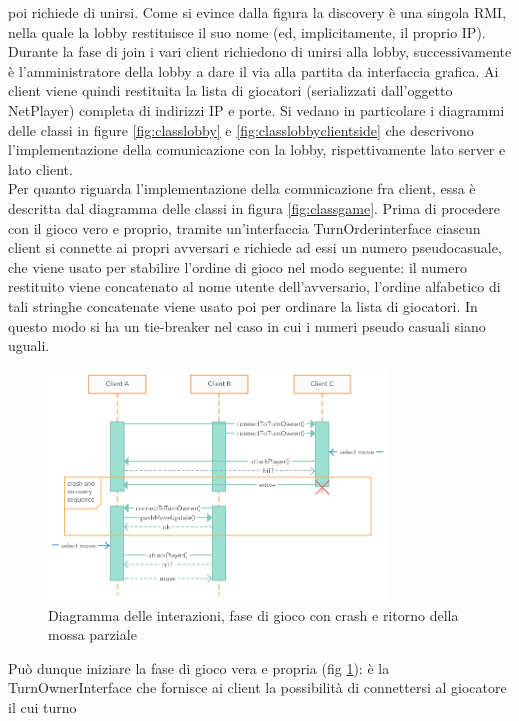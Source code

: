 poi richiede di unirsi. Come si evince dalla figura la discovery è una singola 
RMI, nella quale la lobby restituisce il suo nome (ed, implicitamente, il 
proprio IP). Durante la fase di join i vari client richiedono di unirsi alla 
lobby, successivamente è l'amministratore della lobby a dare il via alla 
partita da interfaccia grafica. Ai client viene quindi restituita la lista di 
giocatori (serializzati dall'oggetto NetPlayer) completa di indirizzi IP e 
porte. Si vedano in particolare i diagrammi delle classi in figure \ref{fig:classlobby}
e \ref{fig:classlobbyclientside} che descrivono l'implementazione della comunicazione con la lobby,
rispettivamente lato server e lato client.
\\
Per quanto riguarda l'implementazione della comunicazione fra client, essa è descritta dal
diagramma delle classi in figura \ref{fig:classgame}.
Prima di procedere con il gioco vero e proprio, tramite un'interfaccia 
TurnOrderinterface ciascun client si connette ai propri avversari e richiede ad 
essi un numero pseudocasuale, che viene usato per stabilire l'ordine di gioco 
nel modo seguente: il numero restituito viene concatenato al nome utente 
dell'avversario, l'ordine alfabetico di tali stringhe concatenate viene usato 
poi per ordinare la lista di giocatori. In questo modo si ha un tie-breaker nel 
caso in cui i numeri pseudo casuali siano uguali.
\\
\begin{figure}[!ht]
    \centering
    \includegraphics[width=0.8\textwidth]{core/imgs/UML/sequence/game.png}
    \caption{Diagramma delle interazioni, fase di gioco con crash e ritorno 
della mossa parziale}
    \label{fig:gameseq}
\end{figure}
Può dunque iniziare la fase di gioco vera e propria (fig \ref{fig:gameseq}): è 
la TurnOwnerInterface 
che fornisce ai client la possibilità di connettersi al giocatore il cui turno 
